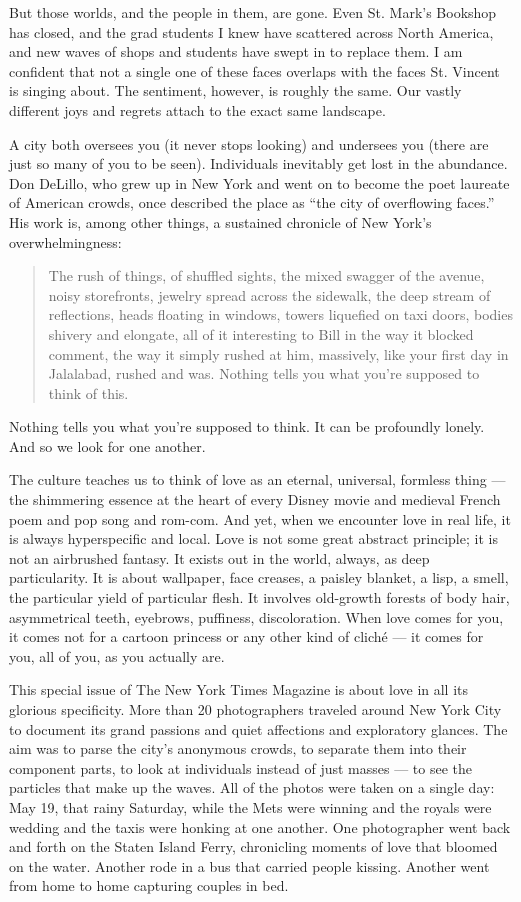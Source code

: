 But those worlds, and the people in them, are gone. Even St. Mark's
Bookshop has closed, and the grad students I knew have scattered across
North America, and new waves of shops and students have swept in to
replace them. I am confident that not a single one of these faces
overlaps with the faces St. Vincent is singing about. The sentiment,
however, is roughly the same. Our vastly different joys and regrets
attach to the exact same landscape.

A city both oversees you (it never stops looking) and undersees you
(there are just so many of you to be seen). Individuals inevitably get
lost in the abundance. Don DeLillo, who grew up in New York and went on
to become the poet laureate of American crowds, once described the place
as ``the city of overflowing faces.'' His work is, among other things, a
sustained chronicle of New York's overwhelmingness:

\begin{quote}
The rush of things, of shuffled sights, the mixed swagger of the avenue,
noisy storefronts, jewelry spread across the sidewalk, the deep stream
of reflections, heads floating in windows, towers liquefied on taxi
doors, bodies shivery and elongate, all of it interesting to Bill in the
way it blocked comment, the way it simply rushed at him, massively, like
your first day in Jalalabad, rushed and was. Nothing tells you what
you're supposed to think of this.
\end{quote}

Nothing tells you what you're supposed to think. It can be profoundly
lonely. And so we look for one another.

The culture teaches us to think of love as an eternal, universal,
formless thing --- the shimmering essence at the heart of every Disney
movie and medieval French poem and pop song and rom-com. And yet, when
we encounter love in real life, it is always hyperspecific and local.
Love is not some great abstract principle; it is not an airbrushed
fantasy. It exists out in the world, always, as deep particularity. It
is about wallpaper, face creases, a paisley blanket, a lisp, a smell,
the particular yield of particular flesh. It involves old-growth forests
of body hair, asymmetrical teeth, eyebrows, puffiness, discoloration.
When love comes for you, it comes not for a cartoon princess or any
other kind of cliché --- it comes for you, all of you, as you actually
are.

This special issue of The New York Times Magazine is about love in all
its glorious specificity. More than 20 photographers traveled around New
York City to document its grand passions and quiet affections and
exploratory glances. The aim was to parse the city's anonymous crowds,
to separate them into their component parts, to look at individuals
instead of just masses --- to see the particles that make up the waves.
All of the photos were taken on a single day: May 19, that rainy
Saturday, while the Mets were winning and the royals were wedding and
the taxis were honking at one another. One photographer went back and
forth on the Staten Island Ferry, chronicling moments of love that
bloomed on the water. Another rode in a bus that carried people kissing.
Another went from home to home capturing couples in bed.

